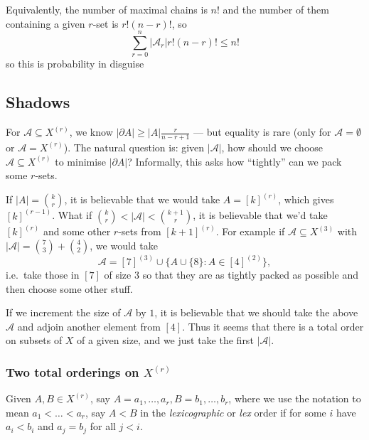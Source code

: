\documentclass[a4paper]{article}
\newcommand{\shadow}{\partial}
\begin{document}

\begin{remark}
  Equivalently, the number of maximal chains is \(n!\) and the number of them containing a given \(r\)-set is \(r! (n - r)!\), so
  \[
    \sum_{r = 0}^n |\mathcal A_r| r! (n - r)! \leq n!
  \]
  so this is probability in disguise
\end{remark}

\subsection{Shadows}

For \(\mathcal A \subseteq X^{(r)}\), we know \(|\shadow A| \geq |A| \frac{r}{n - r + 1}\) --- but equality is rare (only for \(\mathcal A = \emptyset\) or \(\mathcal A = X^{(r)}\)). The natural question is: given \(|\mathcal A|\), how should we choose \(\mathcal A \subseteq X^{(r)}\) to minimise \(|\shadow A|\)? Informally, this asks how ``tightly'' can we pack some \(r\)-sets.

If \(|A| = \binom{k}{r}\), it is believable that we would take \(A = [k]^{(r)}\), which gives \([k]^{(r - 1)}\). What if \(\binom{k}{r} < |\mathcal A| <\binom{k + 1}{r}\), it is believable that we'd take \([k]^{(r)}\) and some other \(r\)-sets from \([k + 1]^{(r)}\). For example if \(\mathcal A \subseteq X^{(3)}\) with \(|\mathcal A| = \binom{7}{3} + \binom{4}{2}\), we would take
\[
  \mathcal A = [7]^{(3)} \cup \{A \cup \{8\}: A \in [4]^{(2)}\},
\]
i.e.\ take those in \([7]\) of size \(3\) so that they are as tightly packed as possible and then choose some other stuff.

If we increment the size of \(\mathcal A\) by \(1\), it is believable that we should take the above \(\mathcal A\) and adjoin another element from \([4]\). Thus it seems that there is a total order on subsets of \(X\) of a given size, and we just take the first \(|\mathcal A|\).

\subsubsection{Two total orderings on \(X^{(r)}\)}

\begin{definition}
  Given \(A, B \in X^{(r)}\), say \(A = a_1, \dots, a_r, B = b_1, \dots, b_r\), where we use the notation to mean \(a_1 < \dots < a_r\), say \(A < B\) in the \emph{lexicographic} or \emph{lex} order if for some \(i\) have \(a_i < b_i\) and \(a_j = b_j\) for all \(j < i\).
\end{definition}
\end{document}
